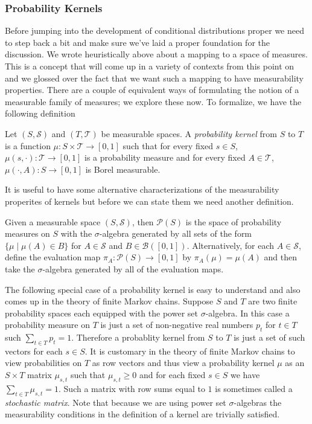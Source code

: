 \subsubsection{Probability Kernels}
Before jumping into the development of conditional distributions
proper we need to step back a bit and make sure we've laid a proper
foundation for the discussion.  We wrote heuristically above about a
mapping to a space of measures.  This is a concept that will come up in a variety of contexts from this point
on and we glossed over the fact that we want such a mapping to have
measurability properties.  There are a couple of equivalent ways of
formulating the notion of a measurable family of measures;  we
explore these now.
To formalize, we have the following definition
\begin{defn}
Let $(S, \mathcal{S})$ and $(T, \mathcal{T})$ be measurable spaces.  A
\emph{probability kernel} from $S$ to $T$ is a function $\mu : S
\times \mathcal{T} \to [0,1]$ 
such that for every fixed $s \in S$, $\mu(s, \cdot) : \mathcal{T} \to
[0,1]$ is a probability measure and for every fixed $A \in
\mathcal{T}$, $\mu(\cdot, A) : S \to [0,1]$ is Borel measurable.
\end{defn}

It is useful to have some alternative characterizations of the
measurability properites of kernels but before we can state them we
need another definition.
\begin{defn}Given a measurable space $(S, \mathcal{S})$, then
  $\mathcal{P}(S)$ is the space of probability measures on $S$ with
  the $\sigma$-algebra generated by all sets of the form $\lbrace \mu
  \mid \mu(A) \in B \rbrace$ for $A \in \mathcal{S}$ and $B \in
  \mathcal{B}([0,1])$.  Alternatively, for each $A \in \mathcal{S}$,
  define the evaluation map $\pi_A : \mathcal{P}(S) \to [0,1]$ by
  $\pi_A(\mu) = \mu(A)$ and then take the $\sigma$-algebra generated
  by all of the evaluation maps.
\end{defn}

\begin{examp}
The following special case of a probability kernel is easy to
understand and also comes up in the theory of finite Markov chains.
Suppose $S$ and $T$ are two finite probability spaces each equipped with the power
set $\sigma$-algebra.  In this case a probability measure on $T$ is just
a set of non-negative real numbers $p_t$ for $t \in T$ such $\sum_{t
  \in T} p_t = 1$.  Therefore a probablity kernel from $S$ to $T$ is
just a set of such vectors for each $s \in S$.   It is customary in
the theory of finite Markov chains to view probabilities on $T$ as row
vectors and thus view a probability kernel $\mu$ as an $S \times T$ matrix
$\mu_{s,t}$ such that $\mu_{s,t} \geq 0$ and for each fixed $s \in S$
we have $\sum_{t \in T} \mu_{s,t} = 1$.  Such a matrix with row sums
equal to $1$ is sometimes called a \emph{stochastic matrix}.
Note that because we are using power set $\sigma$-algebras the
measurability conditions in the definition of a kernel are trivially
satisfied.
\end{examp}


